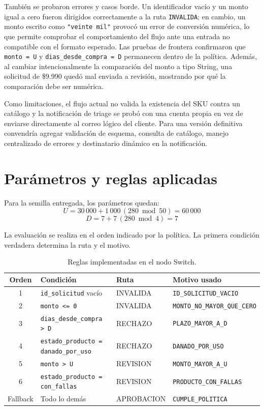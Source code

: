 \documentclass[11pt,a4paper]{article}
\newcommand{\code}[1]{\texttt{#1}}
\begin{document}
También se probaron errores y casos borde. Un identificador vacío y un monto igual a cero fueron dirigidos correctamente a la ruta \code{INVALIDA}; en cambio, un monto escrito como \texttt{"veinte mil"} provocó un error de conversión numérica, lo que permite comprobar el comportamiento del flujo ante una entrada no compatible con el formato esperado. Las pruebas de frontera confirmaron que \code{monto = U} y \code{dias\_desde\_compra = D} permanecen dentro de la política. Además, al cambiar intencionalmente la comparación del monto a tipo String, una solicitud de \$9.990 quedó mal enviada a revisión, mostrando por qué la comparación debe ser numérica.

Como limitaciones, el flujo actual no valida la existencia del SKU contra un catálogo y la notificación de triage se probó con una cuenta propia en vez de enviarse directamente al correo lógico del cliente. Para una versión definitiva convendría agregar validación de esquema, consulta de catálogo, manejo centralizado de errores y destinatario dinámico en la notificación.

\newpage
\section{Parámetros y reglas aplicadas}

Para la semilla entregada, los parámetros quedan:
\[
U = 30\,000 + 1\,000\,(280 \bmod 50) = 60\,000
\]
\[
D = 7 + 7\,(280 \bmod 4) = 7
\]

La evaluación se realiza en el orden indicado por la política. La primera condición verdadera determina la ruta y el motivo.

\begin{table}[H]
\centering
\small
\begin{tabularx}{\textwidth}{@{}c >{\raggedright\arraybackslash}X l >{\raggedright\arraybackslash}X@{}}
\toprule
\textbf{Orden} & \textbf{Condición} & \textbf{Ruta} & \textbf{Motivo usado} \\
\midrule
1 & \code{id\_solicitud} vacío & INVALIDA & \code{ID\_SOLICITUD\_VACIO} \\
2 & \code{monto <= 0} & INVALIDA & \code{MONTO\_NO\_MAYOR\_QUE\_CERO} \\
3 & \code{dias\_desde\_compra > D} & RECHAZO & \code{PLAZO\_MAYOR\_A\_D} \\
4 & \code{estado\_producto = danado\_por\_uso} & RECHAZO & \code{DANADO\_POR\_USO} \\
5 & \code{monto > U} & REVISION & \code{MONTO\_MAYOR\_A\_U} \\
6 & \code{estado\_producto = con\_fallas} & REVISION & \code{PRODUCTO\_CON\_FALLAS} \\
Fallback & Todo lo demás & APROBACION & \code{CUMPLE\_POLITICA} \\
\bottomrule
\end{tabularx}
\caption{Reglas implementadas en el nodo Switch.}
\end{table}
\end{document}
